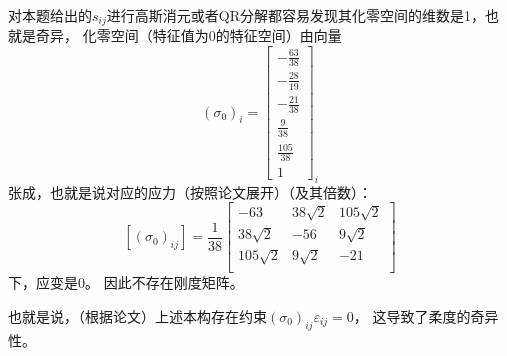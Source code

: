\documentclass[UTF8,zihao=5]{ctexart}
\begin{document}
对本题给出的$s_{ij}$进行高斯消元或者QR分解都容易发现其化零空间的维数是1，也就是奇异，
化零空间（特征值为0的特征空间）由向量
$$
    (\sigma_0)_i=\left[\begin{array}{c} -\frac{63}{38} \\
            -\frac{28}{19}     \\ -\frac{21}{38}\\
            \frac{9}{38}       \\ \frac{105}{38}\\ 1\end{array}\right]_i
$$
张成，也就是说对应的应力（按照论文展开）（及其倍数）：
$$
    [(\sigma_0)_{ij}]=
    \frac{1}{38}\begin{bmatrix}
        -63         & 38\sqrt{2} & 105\sqrt{2} \\
        38\sqrt{2}  & -56        & 9\sqrt{2}    \\
        105\sqrt{2} & 9\sqrt{2}  & -21         \\
    \end{bmatrix}
$$
下，应变是0。
因此不存在刚度矩阵。

也就是说，（根据论文）上述本构存在约束$(\sigma_0)_{ij}\varepsilon_{ij}=0$，
这导致了柔度的奇异性。
\end{document}
